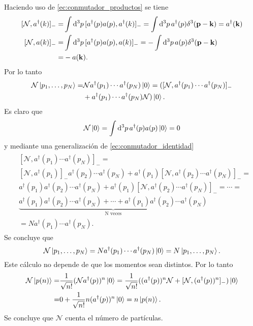 \documentclass{article}
\begin{document}
Haciendo uso de \eqref{ec:conmutador_productos} se tiene
\begin{align}
\begin{split}
[\mathcal{N},a^\dagger(k)]_-=&\int\dd[3]{p}[a^\dagger(p)a(p),a^\dagger(k)]_-=\int\dd[3]{p}a^\dagger(p)\delta^3(\vb{p}-\vb{k})=a^\dagger(\vb{k})\\
[\mathcal{N},a(k)]_-=&\int\dd[3]{p}[a^\dagger(p)a(p),a(k)]_-=-\int\dd[3]{p}a(p)\delta^3(\vb{p}-\vb{k})\\
=&-a(\vb{k}).
\end{split}
\end{align}
Por lo tanto
\begin{align}
\begin{split}
\mathcal{N}\ket{p_1,\dots,p_N}=&\mathcal{N}a^\dagger(p_1)\cdots a^\dagger(p_N)\ket{0}=([\mathcal{N},a^\dagger(p_1)\cdots a^\dagger(p_N)]_-\\
&+a^\dagger(p_1)\cdots a^\dagger(p_N)\mathcal{N})\ket{0}.
\end{split}
\end{align}
Es claro que
\begin{equation}
\mathcal{N}\ket{0}=\int\dd[3]{p}a^\dagger(p)a(p)\ket{0}=0
\end{equation}
y mediante una generalización de \eqref{ec:conmutador_identidad}
\begin{align}
\begin{split}
&[\mathcal{N},a^\dagger(p_1)\cdots a^\dagger(p_N)]_-=\\
&[\mathcal{N},a^\dagger(p_1)]_-a^\dagger(p_2)\cdots a^\dagger(p_N)+a^\dagger(p_1)[\mathcal{N},a^\dagger(p_2)\cdots a^\dagger(p_N)]_-=\\
&a^\dagger(p_1)a^\dagger(p_2)\cdots a^\dagger(p_N)+a^\dagger(p_1)[\mathcal{N},a^\dagger(p_2)\cdots a^\dagger(p_N)]_-=\cdots=\\
&\underbrace{a^\dagger(p_1)a^\dagger(p_2)\cdots a^\dagger(p_N)+\cdots+a^\dagger(p_1)a^\dagger(p_2)\cdots a^\dagger(p_N)}_{\text{N veces}}\\
&=Na^\dagger(p_1)\cdots a^\dagger(p_N).
\end{split}
\end{align}
Se concluye que
\begin{equation}
\mathcal{N}\ket{p_1,\dots,p_N}=Na^\dagger(p_1)\cdots a^\dagger(p_N)\ket{0}=N\ket{p_1,\dots,p_N}.
\end{equation} 
Este cálculo no depende de que los momentos sean distintos. Por lo tanto
\begin{align}
\begin{split}
\mathcal{N}\ket{p(n)}=&\frac{1}{\sqrt{n!}}(\mathcal{N}a^\dagger(p))^n\ket{0}=\frac{1}{\sqrt{n!}}((a^\dagger(p))^n\mathcal{N}+[\mathcal{N},(a^\dagger(p))^n]_-)\ket{0}\\
=&0+\frac{1}{\sqrt{n!}}n(a^\dagger(p))^n\ket{0}=n\ket{p(n)}.
\end{split}
\end{align}
Se concluye que $\mathcal{N}$ cuenta el número de partículas.
\end{document}
